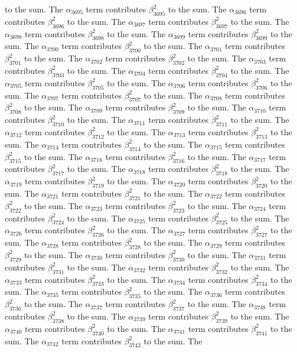 \begin{lemma}
to the sum. The $\alpha_{3695}$ term contributes $\beta_{3695}^{2}$ to the sum. The $\alpha_{3696}$ term contributes $\beta_{3696}^{2}$ to the sum. The $\alpha_{3697}$ term contributes $\beta_{3697}^{2}$ to the sum. The $\alpha_{3698}$ term contributes $\beta_{3698}^{2}$ to the sum. The $\alpha_{3699}$ term contributes $\beta_{3699}^{2}$ to the sum. The $\alpha_{3700}$ term contributes $\beta_{3700}^{2}$ to the sum. The $\alpha_{3701}$ term contributes $\beta_{3701}^{2}$ to the sum. The $\alpha_{3702}$ term contributes $\beta_{3702}^{2}$ to the sum. The $\alpha_{3703}$ term contributes $\beta_{3703}^{2}$ to the sum. The $\alpha_{3704}$ term contributes $\beta_{3704}^{2}$ to the sum. The $\alpha_{3705}$ term contributes $\beta_{3705}^{2}$ to the sum. The $\alpha_{3706}$ term contributes $\beta_{3706}^{2}$ to the sum. The $\alpha_{3707}$ term contributes $\beta_{3707}^{2}$ to the sum. The $\alpha_{3708}$ term contributes $\beta_{3708}^{2}$ to the sum. The $\alpha_{3709}$ term contributes $\beta_{3709}^{2}$ to the sum. The $\alpha_{3710}$ term contributes $\beta_{3710}^{2}$ to the sum. The $\alpha_{3711}$ term contributes $\beta_{3711}^{2}$ to the sum. The $\alpha_{3712}$ term contributes $\beta_{3712}^{2}$ to the sum. The $\alpha_{3713}$ term contributes $\beta_{3713}^{2}$ to the sum. The $\alpha_{3714}$ term contributes $\beta_{3714}^{2}$ to the sum. The $\alpha_{3715}$ term contributes $\beta_{3715}^{2}$ to the sum. The $\alpha_{3716}$ term contributes $\beta_{3716}^{2}$ to the sum. The $\alpha_{3717}$ term contributes $\beta_{3717}^{2}$ to the sum. The $\alpha_{3718}$ term contributes $\beta_{3718}^{2}$ to the sum. The $\alpha_{3719}$ term contributes $\beta_{3719}^{2}$ to the sum. The $\alpha_{3720}$ term contributes $\beta_{3720}^{2}$ to the sum. The $\alpha_{3721}$ term contributes $\beta_{3721}^{2}$ to the sum. The $\alpha_{3722}$ term contributes $\beta_{3722}^{2}$ to the sum. The $\alpha_{3723}$ term contributes $\beta_{3723}^{2}$ to the sum. The $\alpha_{3724}$ term contributes $\beta_{3724}^{2}$ to the sum. The $\alpha_{3725}$ term contributes $\beta_{3725}^{2}$ to the sum. The $\alpha_{3726}$ term contributes $\beta_{3726}^{2}$ to the sum. The $\alpha_{3727}$ term contributes $\beta_{3727}^{2}$ to the sum. The $\alpha_{3728}$ term contributes $\beta_{3728}^{2}$ to the sum. The $\alpha_{3729}$ term contributes $\beta_{3729}^{2}$ to the sum. The $\alpha_{3730}$ term contributes $\beta_{3730}^{2}$ to the sum. The $\alpha_{3731}$ term contributes $\beta_{3731}^{2}$ to the sum. The $\alpha_{3732}$ term contributes $\beta_{3732}^{2}$ to the sum. The $\alpha_{3733}$ term contributes $\beta_{3733}^{2}$ to the sum. The $\alpha_{3734}$ term contributes $\beta_{3734}^{2}$ to the sum. The $\alpha_{3735}$ term contributes $\beta_{3735}^{2}$ to the sum. The $\alpha_{3736}$ term contributes $\beta_{3736}^{2}$ to the sum. The $\alpha_{3737}$ term contributes $\beta_{3737}^{2}$ to the sum. The $\alpha_{3738}$ term contributes $\beta_{3738}^{2}$ to the sum. The $\alpha_{3739}$ term contributes $\beta_{3739}^{2}$ to the sum. The $\alpha_{3740}$ term contributes $\beta_{3740}^{2}$ to the sum. The $\alpha_{3741}$ term contributes $\beta_{3741}^{2}$ to the sum. The $\alpha_{3742}$ term contributes $\beta_{3742}^{2}$ to the sum. The 
\end{lemma}

